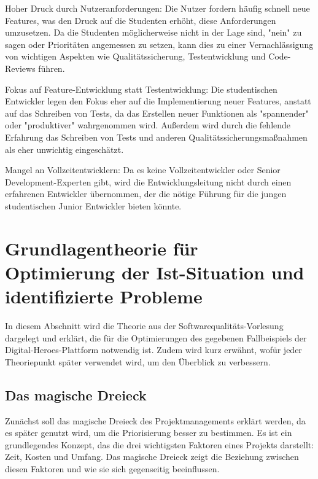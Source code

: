 Hoher Druck durch Nutzeranforderungen: Die Nutzer fordern häufig schnell neue Features, 
was den Druck auf die Studenten erhöht, diese Anforderungen umzusetzen. 
Da die Studenten möglicherweise nicht in der Lage sind, 
"nein" zu sagen oder Prioritäten angemessen zu setzen, 
kann dies zu einer Vernachlässigung von wichtigen Aspekten wie Qualitätssicherung, 
Testentwicklung und Code-Reviews führen. 

Fokus auf Feature-Entwicklung statt Testentwicklung: Die studentischen Entwickler legen den Fokus eher auf 
die Implementierung neuer Features, anstatt auf das Schreiben von Tests, 
da das Erstellen neuer Funktionen als "spannender" oder "produktiver" wahrgenommen wird. 
Außerdem wird durch die fehlende Erfahrung das Schreiben von Tests und anderen 
Qualitätssicherungsmaßnahmen als eher unwichtig eingeschätzt. 

Mangel an Vollzeitentwicklern: Da es keine Vollzeitentwickler oder Senior Development-Experten gibt,
wird die Entwicklungsleitung nicht durch einen erfahrenen Entwickler übernommen, 
der die nötige Führung für die jungen studentischen Junior Entwickler bieten könnte.

\section{Grundlagentheorie für Optimierung der Ist-Situation und identifizierte Probleme}

In diesem Abschnitt wird die Theorie aus der Softwarequalitäts-Vorlesung 
dargelegt und erklärt, die für die Optimierungen des gegebenen 
Fallbeispiels der Digital-Heroes-Plattform notwendig ist. 
Zudem wird kurz erwähnt, wofür jeder Theoriepunkt später verwendet wird, 
um den Überblick zu verbessern. 

\subsection*{Das magische Dreieck}

Zunächst soll das magische Dreieck des Projektmanagements erklärt werden, 
da es später genutzt wird, um die Priorisierung besser zu bestimmen. Es ist ein grundlegendes Konzept, 
das die drei wichtigsten Faktoren eines Projekts darstellt: Zeit, Kosten und Umfang. 
Das magische Dreieck zeigt die Beziehung zwischen diesen Faktoren und wie sie sich gegenseitig beeinflussen.

